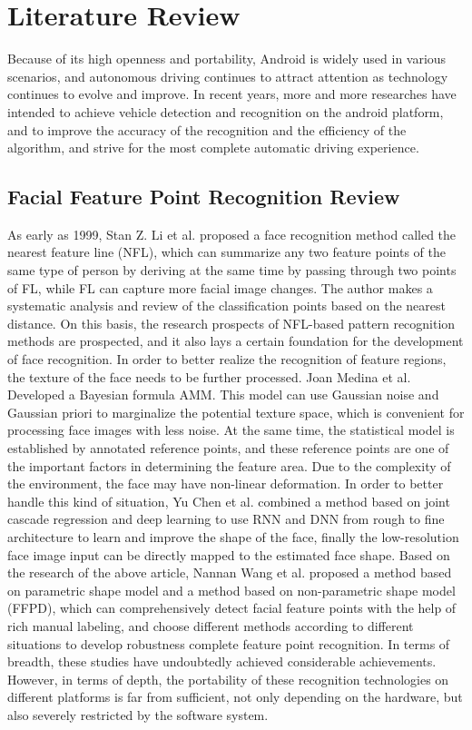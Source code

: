 \documentclass[12pt, a4paper]{article}
\begin{document}
\section{Literature Review}
Because of its high openness and portability, Android is widely used in various scenarios, and autonomous driving continues to attract attention as technology continues to evolve and improve. In recent years, more and more researches have intended to achieve vehicle detection and recognition on the android platform, and to improve the accuracy of the recognition and the efficiency of the algorithm, and strive for the most complete automatic driving experience. 
\subsection{Facial Feature Point Recognition Review}
As early as 1999, Stan Z. Li et al. \cite{li} proposed a face recognition method called the nearest feature line (NFL), which can summarize any two feature points of the same type of person by deriving at the same time by passing through two points of FL, while FL can capture more facial image changes. The author makes a systematic analysis and review of the classification points based on the nearest distance. On this basis, the research prospects of NFL-based pattern recognition methods are prospected, and it also lays a certain foundation for the development of face recognition.
In order to better realize the recognition of feature regions, the texture of the face needs to be further processed. Joan Medina et al. \cite{am} Developed a Bayesian formula AMM. This model can use Gaussian noise and Gaussian priori to marginalize the potential texture space, which is convenient for processing face images with less noise. At the same time, the statistical model is established by annotated reference points, and these reference points are one of the important factors in determining the feature area.
Due to the complexity of the environment, the face may have non-linear deformation. In order to better handle this kind of situation, Yu Chen et al. \cite{chen} combined a method based on joint cascade regression \cite{yu} and deep learning to use RNN and DNN from rough to fine architecture to learn and improve the shape of the face, finally the low-resolution face image input can be directly mapped to the estimated face shape.
Based on the research of the above article, Nannan Wang et al. \cite{wang} proposed a method based on parametric shape model and a method based on non-parametric shape model (FFPD), which can comprehensively detect facial feature points with the help of rich manual labeling, and choose different methods according to different situations to develop robustness \cite{ding} complete feature point recognition.
In terms of breadth, these studies have undoubtedly achieved considerable achievements. However, in terms of depth, the portability of these recognition technologies on different platforms is far from sufficient, not only depending on the hardware, but also severely restricted by the software system.
\end{document}

